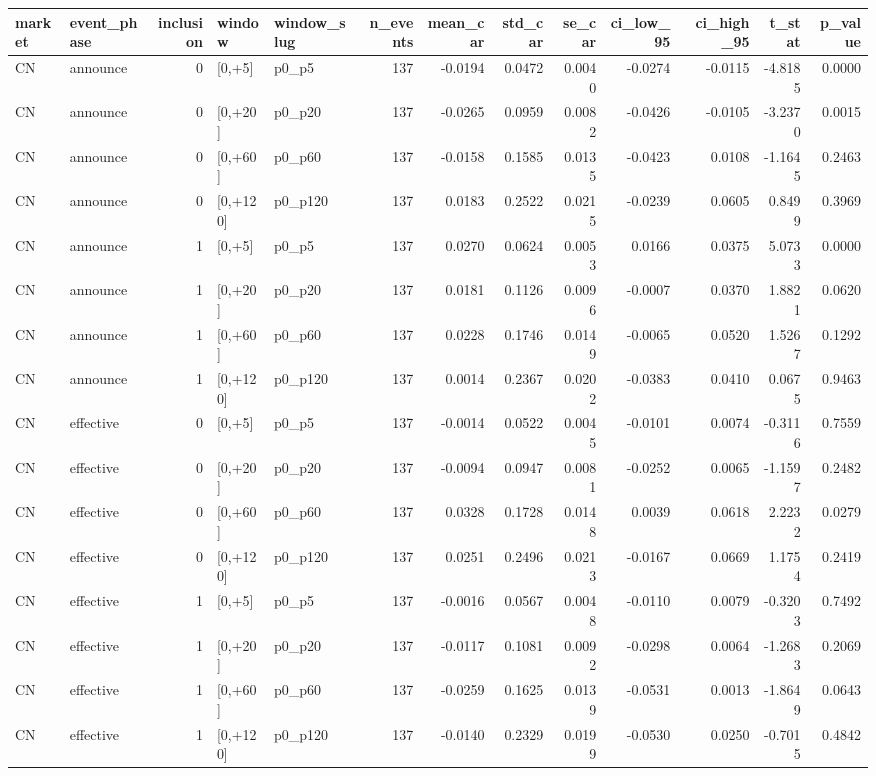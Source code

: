 \begin{tabular}{llrllrrrrrrrr}
\toprule
market & event_phase & inclusion & window & window_slug & n_events & mean_car & std_car & se_car & ci_low_95 & ci_high_95 & t_stat & p_value \\
\midrule
CN & announce & 0 & [0,+5] & p0_p5 & 137 & -0.0194 & 0.0472 & 0.0040 & -0.0274 & -0.0115 & -4.8185 & 0.0000 \\
CN & announce & 0 & [0,+20] & p0_p20 & 137 & -0.0265 & 0.0959 & 0.0082 & -0.0426 & -0.0105 & -3.2370 & 0.0015 \\
CN & announce & 0 & [0,+60] & p0_p60 & 137 & -0.0158 & 0.1585 & 0.0135 & -0.0423 & 0.0108 & -1.1645 & 0.2463 \\
CN & announce & 0 & [0,+120] & p0_p120 & 137 & 0.0183 & 0.2522 & 0.0215 & -0.0239 & 0.0605 & 0.8499 & 0.3969 \\
CN & announce & 1 & [0,+5] & p0_p5 & 137 & 0.0270 & 0.0624 & 0.0053 & 0.0166 & 0.0375 & 5.0733 & 0.0000 \\
CN & announce & 1 & [0,+20] & p0_p20 & 137 & 0.0181 & 0.1126 & 0.0096 & -0.0007 & 0.0370 & 1.8821 & 0.0620 \\
CN & announce & 1 & [0,+60] & p0_p60 & 137 & 0.0228 & 0.1746 & 0.0149 & -0.0065 & 0.0520 & 1.5267 & 0.1292 \\
CN & announce & 1 & [0,+120] & p0_p120 & 137 & 0.0014 & 0.2367 & 0.0202 & -0.0383 & 0.0410 & 0.0675 & 0.9463 \\
CN & effective & 0 & [0,+5] & p0_p5 & 137 & -0.0014 & 0.0522 & 0.0045 & -0.0101 & 0.0074 & -0.3116 & 0.7559 \\
CN & effective & 0 & [0,+20] & p0_p20 & 137 & -0.0094 & 0.0947 & 0.0081 & -0.0252 & 0.0065 & -1.1597 & 0.2482 \\
CN & effective & 0 & [0,+60] & p0_p60 & 137 & 0.0328 & 0.1728 & 0.0148 & 0.0039 & 0.0618 & 2.2232 & 0.0279 \\
CN & effective & 0 & [0,+120] & p0_p120 & 137 & 0.0251 & 0.2496 & 0.0213 & -0.0167 & 0.0669 & 1.1754 & 0.2419 \\
CN & effective & 1 & [0,+5] & p0_p5 & 137 & -0.0016 & 0.0567 & 0.0048 & -0.0110 & 0.0079 & -0.3203 & 0.7492 \\
CN & effective & 1 & [0,+20] & p0_p20 & 137 & -0.0117 & 0.1081 & 0.0092 & -0.0298 & 0.0064 & -1.2683 & 0.2069 \\
CN & effective & 1 & [0,+60] & p0_p60 & 137 & -0.0259 & 0.1625 & 0.0139 & -0.0531 & 0.0013 & -1.8649 & 0.0643 \\
CN & effective & 1 & [0,+120] & p0_p120 & 137 & -0.0140 & 0.2329 & 0.0199 & -0.0530 & 0.0250 & -0.7015 & 0.4842 \\

\end{tabular}
